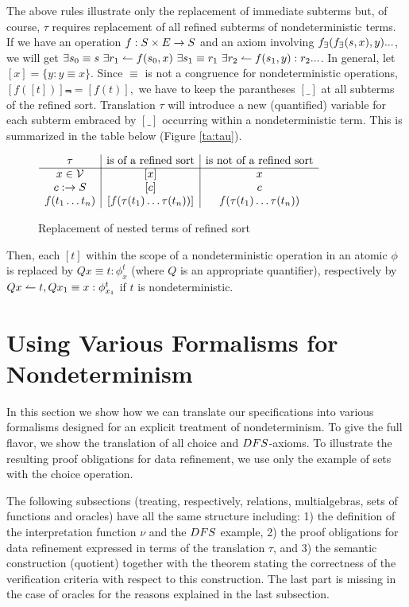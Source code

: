 The above rules illustrate only the replacement of immediate subterms but, of course, $\tau$
requires replacement of all refined subterms of nondeterministic terms. If we have an operation $f:S\times E\rightarrow S$ and an axiom involving $f_\exists(f_\exists(s,x),y)...$, we will get $\exists s_0\equiv s\ \exists r_1\isres f(s_0,x)\ \exists s_1\equiv r_1\ \exists r_2\isres f(s_1,y):r_2...$. In general, let $[x]=\{y:y\equiv x\}$. 
Since $\equiv$ is not a congruence for nondeterministic
operations, $[f([t])]\Not=[f(t)],$ we have to keep the parantheses $[\_]$ at all subterms of the refined sort. Translation $\tau$ will introduce a new (quantified) variable for each subterm embraced by $[\_]$ occurring within a nondeterministic term.
This is summarized in the table below (Figure \ref{ta:tau}). %
\begin{figure}[hbt]
\centering
\( \begin{array}{c|c|c}
\tau & $is of a refined sort$ & $is not of a refined sort$ \\ \cline{1-3} x\in {\cal V}	& [x]	& x \\
c:\into S	& [c]	& c \\
f(t_1\ldots t_n) & [f(\tau(t_1)\ldots\tau(t_n))] & f(\tau(t_1)\ldots\tau(t_n))
\end{array} \) \caption{Replacement of nested terms of refined sort} \label{ta:tau}\label{'tabela'}
\end{figure}
Then, each $[t]$ within the scope of a nondeterministic operation in an atomic
$\phi$ is replaced by $Q x\equiv t : \phi_x^t$ (where $Q$ is an appropriate quantifier), respectively by $Q x\leftharpoonup t,Q x_1\equiv x: \phi_{x_{1}}^t$ if $t$ is nondeterministic. 

\section{Using Various Formalisms for Nondeterminism}\label{se:various} In this section we show how we can translate our specifications into various formalisms designed for
an explicit treatment of nondeterminism. To give the full flavor, we show the
translation of all choice and $DFS$-axioms. To illustrate the resulting proof obligations for data refinement, we use only the example of sets with the choice operation.

The following subsections (treating, respectively, relations, multialgebras, sets of
functions and oracles) have all the same structure including: 1) the definition of the
interpretation function $\nu$ and the $DFS$ example, 2) the proof obligations
for data refinement expressed in terms of the translation $\tau$, and 3) the semantic construction (quotient) together with the theorem stating the correctness of the verification criteria with respect to this construction. The last part is missing in the case of oracles for the reasons explained in the last subsection.


